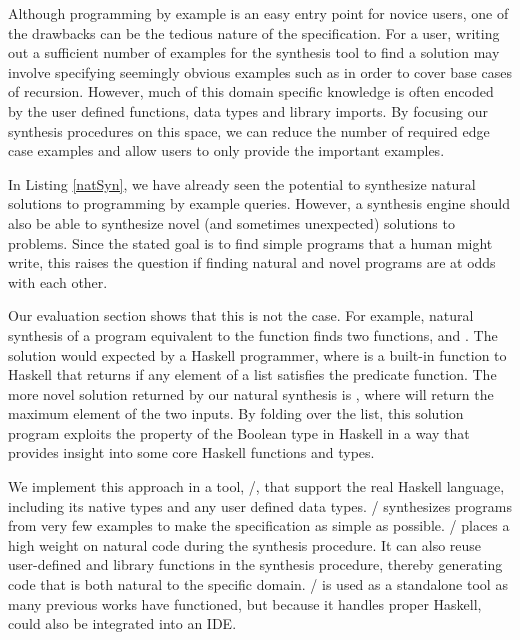 Although programming by example is an easy entry point for novice users, one of the drawbacks can be the tedious nature of the specification.
For a user, writing out a sufficient number of examples for the synthesis tool to find a solution may involve
  specifying seemingly obvious examples such as \codeinline{[]->[]} in order to cover base cases of recursion.
However, much of this domain specific knowledge is often encoded by the user defined functions, data types and library imports.
By focusing our synthesis procedures on this space, we can reduce the number of required edge case examples and allow users to only provide the important examples.

In Listing \ref{natSyn}, we have already seen the potential to synthesize natural solutions to programming by example queries.
However, a synthesis engine should also be able to synthesize novel (and sometimes unexpected) solutions to problems.
Since the stated goal is to find simple programs that a human might write, this raises the question if finding natural and novel programs are at odds with each other.

Our evaluation section shows that this is not the case.
For example, natural synthesis of a program equivalent to the  function finds two functions,  and .
The  solution would expected by a Haskell programmer, where  is a built-in function to Haskell that returns  if any element of a list satisfies the predicate function.
The more novel solution returned by our natural synthesis is , where  will return the maximum element of the two inputs.
By folding over the list, this solution program exploits the  property of the Boolean type in Haskell in a way that provides insight into some core Haskell functions and types.

We implement this approach in a tool, \ourTool/, that support the real Haskell language, including its native types and any user defined data types.
\ourTool/ synthesizes programs from very few examples to make the specification as simple as possible.
\ourTool/ places a high weight on natural code during the synthesis procedure.
It can also reuse user-defined and library functions in the synthesis procedure, thereby generating code that is both natural to the specific domain.
\ourTool/ is used as a standalone tool as many previous works have functioned, but because it handles proper Haskell, could also be integrated into an IDE.

